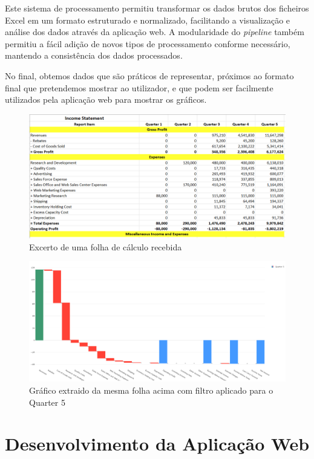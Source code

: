 Este sistema de processamento permitiu transformar os dados brutos dos ficheiros Excel em um formato estruturado e normalizado, facilitando a visualização e análise dos dados através da aplicação web. A modularidade do \textit{pipeline} também permitiu a fácil adição de novos tipos de processamento conforme necessário, mantendo a consistência dos dados processados.

No final, obtemos dados que são práticos de representar, próximos ao formato final que pretendemos mostrar ao utilizador, e que podem ser facilmente utilizados pela aplicação web para mostrar os gráficos.

\begin{figure}[H]
    \centering
    \includegraphics[width=\textwidth]{./img/before}
 \caption{Excerto de uma folha de cálculo recebida}
 \end{figure}


 \begin{figure}[H]
    \centering
    \includegraphics[width=\textwidth]{./img/after}
 \caption{Gráfico extraido da mesma folha acima com filtro aplicado para o Quarter 5}
 \end{figure}

\section{Desenvolvimento da Aplicação Web}

